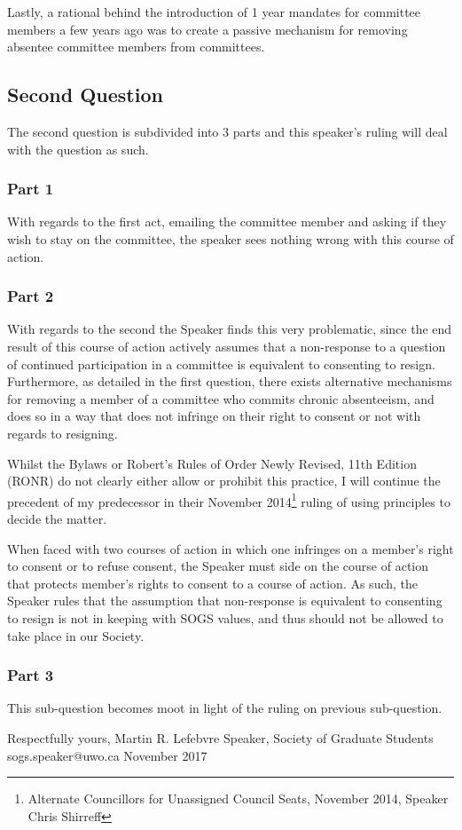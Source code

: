 \begin{multicols}{2}
Lastly, a rational behind the introduction of 1 year mandates for committee members a few years ago was to create a passive mechanism for removing absentee committee members from committees. 


\subsection*{Second Question}

The second question is subdivided into 3 parts and this speaker's ruling will deal with the question as such. 
\subsubsection*{Part 1}
With regards to the first act, emailing the committee member and asking if they wish to stay on the committee, the speaker sees nothing wrong with this course of action. 

\subsubsection*{Part 2}
With regards to the second the Speaker finds this very problematic, since the end result of this course of action actively assumes that a non-response to a question of continued participation in a committee is equivalent to consenting to resign. Furthermore, as detailed in the first question, there exists alternative mechanisms for removing a member of a committee who commits chronic absenteeism, and does so in a way that does not infringe on their right to consent or not with regards to resigning.    

Whilst the Bylaws or Robert's Rules of Order Newly Revised, 11th Edition (RONR) do not clearly either allow or prohibit this practice, I will continue the precedent of my predecessor in their November 2014\footnote{Alternate Councillors for Unassigned Council Seats, November 2014, Speaker Chris Shirreff} ruling of using principles to decide the matter.  

When faced with two courses of action in which one infringes on a member's right to consent or to refuse consent, the Speaker must side on the course of action that protects member's rights to consent to a course of action.  As such, the Speaker rules that the assumption that non-response is equivalent to consenting to resign is not in keeping with SOGS values, and thus should not be allowed to take place in our Society.  
	
\subsubsection*{Part 3}
This sub-question becomes moot in light of the ruling on previous sub-question. 

\end{multicols}


\vskip 3cm
\noindent
Respectfully yours, \newline
\noindent
Martin R. Lefebvre \newline
\indent
Speaker, \newline 
\indent
Society of Graduate Students \newline
\indent
sogs.speaker@uwo.ca \newline
\indent 
November 2017


